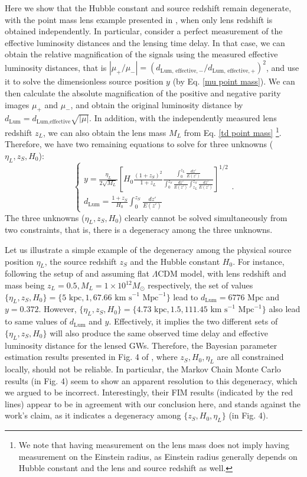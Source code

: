 \documentclass[a4paper,11pt]{article}
\begin{document}
Here we show that the Hubble constant and source redshift remain degenerate, with the point mass lens example presented in \cite{Huang_2023}, when only lens redshift is obtained independently. 
In particular, consider a perfect measurement of the effective luminosity distances and the lensing time delay. 
In that case, we can obtain the relative magnification of the signals using the measured effective luminosity distances, that is $|\mu_+/\mu_-|=(d_{\text{Lum, effective},-}/d_{\text{Lum, effective},+})^2$, and use it to solve the dimensionless source position $y$ (by Eq. \ref{mu point mass}). 
We can then calculate the absolute magnification of the positive and negative parity images $\mu_+$ and $\mu_-$, and obtain the original luminosity distance by $d_\text{Lum}=d_{ \text{Lum,effective}}\sqrt{|\mu|}$. 
In addition, with the independently measured lens redshift $z_L$, we can also obtain the lens mass $M_L$ from Eq. \ref{td point mass} \footnote{We note that having measurement on the lens mass does not imply having measurement on the Einstein radius, as Einstein radius generally depends on Hubble constant and the lens and source redshift as well.}.
Therefore, we have two remaining equations to solve for three unknowns ($\eta_L, z_S, H_0$):
\begin{equation}
\begin{cases}
y=\frac{\eta_L}{2\sqrt{M_L}}\left[H_0\frac{(1+z_S)^2}{1+z_L}\frac{\int_0^{z_L}{\frac{dz'}{E(z')}}}{\int_0^{z_S}{\frac{dz'}{E(z')}}\int_{z_L}^{z_S}{\frac{dz'}{E(z')}}}\right]^{1/2}
\\
d_\text{Lum} = \frac{1+z_S}{H_0}\int_0^{z_S}{\frac{dz'}{E(z')}}
\end{cases}.
\end{equation}
The three unknowns ($\eta_L, z_S, H_0$) clearly cannot be solved simultaneously from two constraints, that is, there is a degeneracy among the three unknowns.

Let us illustrate a simple example of the degeneracy among the physical source position $\eta_L$, the source redshift $z_S$ and the Hubble constant $H_0$.
For instance, following the setup of \cite{Huang_2023} and assuming flat $\Lambda$CDM model, with lens redshift and mass being $z_L=0.5,  M_L=1\times 10^{12} M_{\odot}$ respectively, the set of values $\{\eta_L, z_S, H_0\}=\{5 \text{ kpc}, 1, 67.66 \text{ km s}^{-1}\text{ Mpc}^{-1}\}$ lead to $d_\text{Lum}=6776 \text{ Mpc}$ and $y=0.372$. 
However, $\{\eta_L, z_S, H_0\}=\{4.73\text{ kpc},1.5,111.45 \text{ km s}^{-1}\text{ Mpc}^{-1}\}$  also lead to same values of $d_\text{Lum}$ and $y$.
Effectively, it implies the two different sets of $\{\eta_L, z_S, H_0\}$ will also produce the same observed time delay and effective luminosity distance for the lensed GWs.
Therefore, the Bayesian parameter estimation results presented in Fig. 4 of \cite{Huang_2023}, where $z_S, H_0, \eta_L$ are all constrained locally, should not be reliable.
In particular, the Markov Chain Monte Carlo results (in Fig. 4) seem to show an apparent resolution to this degeneracy, which we argued to be incorrect.
Interestingly, their FIM results (indicated by the red lines) appear to be in agreement with our conclusion here, and stands against the work's claim, as it indicates a degeneracy among $\{z_S, H_0, \eta_L\}$ (in Fig. 4).
\end{document}
